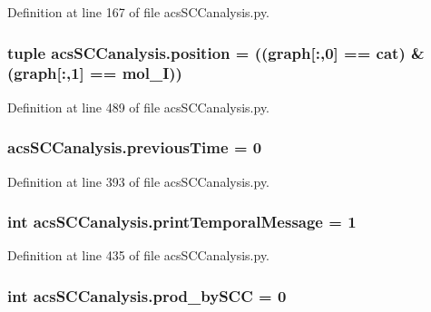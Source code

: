 Definition at line 167 of file acs\-S\-C\-Canalysis.\-py.

\hypertarget{a00128_ac09e85f8df5b7c8c7d2caf87e9193421}{
\subsubsection[{position}]{\setlength{\rightskip}{0pt plus 5cm}tuple acs\-S\-C\-Canalysis.\-position = (({\bf graph}\mbox{[}\-:,0\mbox{]} == {\bf cat}) \& ({\bf graph}\mbox{[}\-:,1\mbox{]} == {\bf mol\-\_\-\-I}))}}\label{a00128_ac09e85f8df5b7c8c7d2caf87e9193421}


Definition at line 489 of file acs\-S\-C\-Canalysis.\-py.

\hypertarget{a00128_aff96a31e98ac46cb47a67b74f5d87351}{
\subsubsection[{previous\-Time}]{\setlength{\rightskip}{0pt plus 5cm}acs\-S\-C\-Canalysis.\-previous\-Time = 0}}\label{a00128_aff96a31e98ac46cb47a67b74f5d87351}


Definition at line 393 of file acs\-S\-C\-Canalysis.\-py.

\hypertarget{a00128_a3de1ee32e24403b152d565d8c52cf7fd}{
\subsubsection[{print\-Temporal\-Message}]{\setlength{\rightskip}{0pt plus 5cm}int acs\-S\-C\-Canalysis.\-print\-Temporal\-Message = 1}}\label{a00128_a3de1ee32e24403b152d565d8c52cf7fd}


Definition at line 435 of file acs\-S\-C\-Canalysis.\-py.

\hypertarget{a00128_abb2ac92624837ae48b882d145c5aab11}{
\subsubsection[{prod\-\_\-by\-S\-C\-C}]{\setlength{\rightskip}{0pt plus 5cm}int acs\-S\-C\-Canalysis.\-prod\-\_\-by\-S\-C\-C = 0}}\label{a00128_abb2ac92624837ae48b882d145c5aab11}



